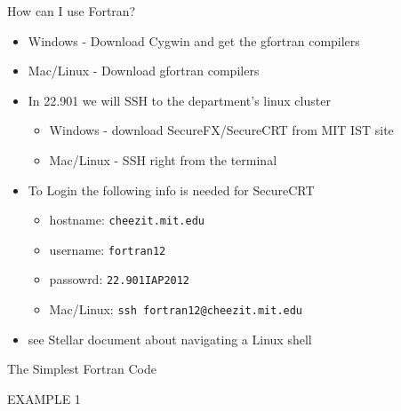 \documentclass{beamer}
\begin{document}
\begin{frame}{How can I use Fortran?}
\begin{itemize}
 
  \item Windows - Download Cygwin and get the gfortran compilers
  \vfill\item Mac/Linux - Download gfortran compilers
  \vfill\item In 22.901 we will SSH to the department's linux cluster
  \begin{itemize}
    \item Windows - download SecureFX/SecureCRT from MIT IST site
    \item Mac/Linux - SSH right from the terminal
  \end{itemize}
  \vfill\item To Login the following info is needed for SecureCRT
  \begin{itemize}
    \item hostname: \texttt{cheezit.mit.edu}
    \item username: \texttt{fortran12}
    \item passowrd: \texttt{22.901IAP2012}
    \item Mac/Linux: \texttt{ssh fortran12@cheezit.mit.edu}
  \end{itemize}
  \vfill\item see Stellar document about navigating a Linux shell
\end{itemize}
\end{frame}
\begin{frame}{The Simplest Fortran Code}
\vfill
\begin{center}
  \Huge{EXAMPLE 1}
\end{center}
\vfill
\end{frame}
\end{document}
